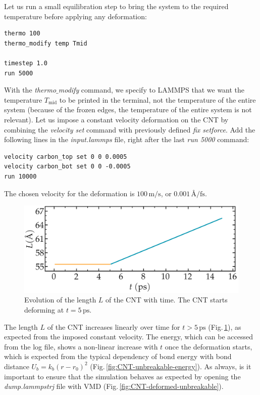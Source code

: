\documentclass[9pt,tutorial]{livecoms}
\begin{document}
Let us run a small equilibration step to bring the system to the required temperature before applying any deformation:
{\normalsize \begin{verbatim}
thermo 100
thermo_modify temp Tmid

timestep 1.0
run 5000
\end{verbatim}}
With the \textit{thermo$\_$modify} command, we specify to LAMMPS that we want the temperature $T_\mathrm{mid}$ to be printed in the terminal, not the temperature of the entire system (because of the frozen edges, the temperature of the entire system is not relevant). Let us impose a constant velocity deformation on the CNT by combining the \textit{velocity set} command with previously defined \textit{fix setforce}. Add the following lines in the \textit{input.lammps} file, right after the last \textit{run 5000} command:
{\normalsize \begin{verbatim}
velocity carbon_top set 0 0 0.0005
velocity carbon_bot set 0 0 -0.0005
run 10000
\end{verbatim}}
\noindent The chosen velocity for the deformation is $100\,\text{m/s}$, or $0.001\,\text{\AA{}/fs}$.

\begin{figure}
\centering
\includegraphics[width=\linewidth]{CNT-lenght-unbreakable}
\caption{Evolution of the length $L$ of the CNT with time. The CNT starts deforming at $t = 5\,\text{ps}$.}
\label{fig:CNT-unbreakable-lenght}
\end{figure}

The length $L$ of the CNT increases linearly over time for $t > 5\,\text{ps}$ (Fig.\,\ref{fig:CNT-unbreakable-lenght}), as expected from the imposed constant velocity. The energy, which can be accessed from the log file, shows a non-linear increase with $t$ once the deformation starts, which is expected from the typical dependency of bond energy with bond distance $U_b = k_b \left( r - r_0 \right)^2$ (Fig.\,\ref{fig:CNT-unbreakable-energy}). As always, is it important to ensure that the simulation behaves as expected by opening the \textit{dump.lammpstrj} file with VMD (Fig.\,\ref{fig:CNT-deformed-unbreakable}).
\end{document}
